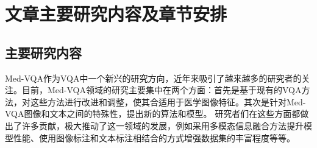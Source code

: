 
\section{文章主要研究内容及章节安排}
\subsection{主要研究内容}
Med-VQA作为VQA中一个新兴的研究方向，近年来吸引了越来越多的研究者的关注。目前，Med-VQA领域的研究主要集中在两个方面：首先是基于现有的VQA方法，对这些方法进行改进和调整，使其合适用于医学图像特征。其次是针对Med-VQA图像和文本之间的特殊性，提出新的算法和模型。
研究者们在这些方面都做出了许多贡献，极大推动了这一领域的发展，例如采用多模态信息融合方法提升模型性能、使用图像标注和文本标注相结合的方式增强数据集的丰富程度等等。

